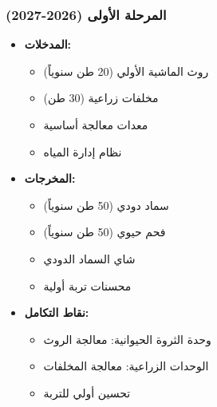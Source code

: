 \subsubsection{المرحلة الأولى (2026-2027)}
\begin{itemize}
    \item \textbf{المدخلات:}
    \begin{itemize}
        \item روث الماشية الأولي (20 طن سنوياً)
        \item مخلفات زراعية (30 طن)
        \item معدات معالجة أساسية
        \item نظام إدارة المياه
    \end{itemize}
    \item \textbf{المخرجات:}
    \begin{itemize}
        \item سماد دودي (50 طن سنوياً)
        \item فحم حيوي (50 طن سنوياً)
        \item شاي السماد الدودي
        \item محسنات تربة أولية
    \end{itemize}
    \item \textbf{نقاط التكامل:}
    \begin{itemize}
        \item وحدة الثروة الحيوانية: معالجة الروث
        \item الوحدات الزراعية: معالجة المخلفات
        \item تحسين أولي للتربة
    \end{itemize}
\end{itemize}

